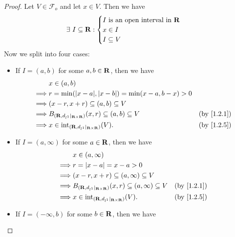 \begin{proof}
  Let \(V \in \mathcal{F}_o\) and let \(x \in V\).
  Then we have
  \[
    \exists\ I \subseteq \mathbf{R} : \begin{cases}
      I \text{ is an open interval in } \mathbf{R} \\
      x \in I                              \\
      I \subseteq V
    \end{cases}
  \]
  Now we split into four cases:
  \begin{itemize}
    \item If \(I = (a, b)\) for some \(a, b \in \mathbf{R}\), then we have
          \begin{align*}
                     & x \in (a, b)                                                                                    \\
            \implies & r = \min(\abs{x - a}, \abs{x - b}) = \min(x - a, b - x) > 0                                     \\
            \implies & (x - r, x + r) \subseteq (a, b) \subseteq V                                                     \\
            \implies & B_{(\R, d_{l^1}|_{\R \times \R})}(x, r) \subseteq (a, b) \subseteq V & \text{(by \cref{1.2.1})} \\
            \implies & x \in \text{int}_{(\R, d_{l^1}|_{\R \times \R})}(V).                 & \text{(by \cref{1.2.5})}
          \end{align*}
    \item If \(I = (a, \infty)\) for some \(a \in \mathbf{R}\), then we have
          \begin{align*}
                     & x \in (a, \infty)                                                                                    \\
            \implies & r = \abs{x - a} = x - a > 0                                                                          \\
            \implies & (x - r, x + r) \subseteq (a, \infty) \subseteq V                                                     \\
            \implies & B_{(\R, d_{l^1}|_{\R \times \R})}(x, r) \subseteq (a, \infty) \subseteq V & \text{(by \cref{1.2.1})} \\
            \implies & x \in \text{int}_{(\R, d_{l^1}|_{\R \times \R})}(V).                      & \text{(by \cref{1.2.5})}
          \end{align*}
    \item If \(I = (-\infty, b)\) for some \(b \in \mathbf{R}\), then we have

\end{itemize}
\end{proof}
